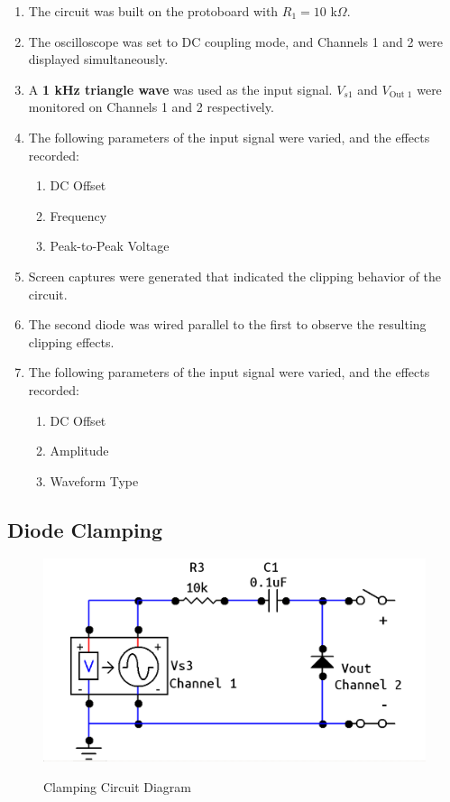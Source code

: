 \documentclass[twocolumn,english]{IEEEtran}
\begin{document}
  \begin{enumerate}
    \item The circuit was built on the protoboard with $R_1=10$ k$\Omega$. %
    \item The oscilloscope was set to DC coupling mode, and Channels 1 and 2 were displayed simultaneously.
    \item A \textbf{1 kHz triangle wave} was used as the input signal. $V_{s1}$ and $V_{\text{Out 1}}$ were monitored on Channels 1 and 2 respectively.
    \item The following parameters of the input signal were varied, and the effects recorded:
      \begin{enumerate}
       \item DC Offset
       \item Frequency
       \item Peak-to-Peak Voltage
      \end{enumerate}
    \item Screen captures were generated that indicated the clipping behavior of the circuit.
    \item The second diode was wired parallel to the first to observe the resulting clipping effects. %
    \item The following parameters of the input signal were varied, and the effects recorded:
      \begin{enumerate}
       \item DC Offset
       \item Amplitude
       \item Waveform Type
      \end{enumerate}
  \end{enumerate}

\subsection{Diode Clamping}
\begin{figure}[h]
  \begin{centering}
  \begin{center}
  \includegraphics[width=\linewidth]{./3a.png}
  \label{fig:circuit_2}
  \caption{Clamping Circuit Diagram}
  \end{center}
  \par\end{centering}
  \end{figure}
\end{document}
